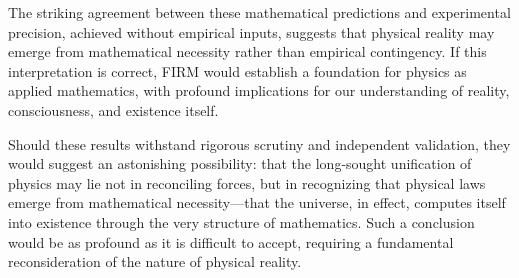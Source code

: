 \documentclass[12pt]{article}
\begin{document}
The striking agreement between these mathematical predictions and experimental precision, achieved without empirical inputs, suggests that physical reality may emerge from mathematical necessity rather than empirical contingency. If this interpretation is correct, FIRM would establish a foundation for physics as applied mathematics, with profound implications for our understanding of reality, consciousness, and existence itself.

Should these results withstand rigorous scrutiny and independent validation, they would suggest an astonishing possibility: that the long-sought unification of physics may lie not in reconciling forces, but in recognizing that physical laws emerge from mathematical necessity—that the universe, in effect, computes itself into existence through the very structure of mathematics. Such a conclusion would be as profound as it is difficult to accept, requiring a fundamental reconsideration of the nature of physical reality.


\label{sec:grace_operator}

\label{sec:dimensional_bridge}

\label{sec:spacetime_quantum_gravity}























\end{document}
